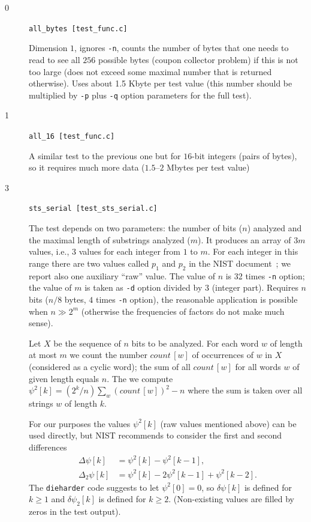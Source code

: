 \documentclass[12pt,a4paper,fullpage]{article}
\begin{document}
\begin{description}

\item[0] \texttt{all\_bytes [test\_func.c]}

Dimension $1$, ignores \texttt{-n}, counts the number of bytes that one needs to read to see all $256$ possible bytes (coupon collector problem) if this is not too large (does not exceed some maximal number that is returned otherwise). Uses about 1.5 Kbyte per test value (this number should be multiplied by \texttt{-p} plus \texttt{-q} option parameters for the full test).

\item[1] \texttt{all\_16 [test\_func.c]}

A similar test to the previous one but for $16$-bit integers (pairs of bytes), so it requires much more data ($1.5$--$2$ Mbytes per test value)

\item[3] \texttt{sts\_serial [test\_sts\_serial.c]}

The test depends on two parameters: the number of bits ($n$) analyzed and the maximal length of substrings analyzed ($m$). It produces an array of $3m$ values, i.e., $3$ values for each  integer from $1$ to $m$. For each integer in this range there are two values called $p_1$ and $p_2$ in the NIST document~\cite{nistsp800-22-1a}; we report also one auxiliary ``raw'' value. The value of $n$ is 32 times \texttt{-n} option; the value of $m$ is taken as \texttt{-d} option divided by $3$ (integer part). Requires $n$ bits ($n/8$ bytes, $4$ times \texttt{-n} option), the reasonable application is possible when $n\gg 2^m$ (otherwise the frequencies of factors do not make much sense). 

Let $X$ be the sequence of $n$ bits to be analyzed. For each word $w$ of length at most $m$ we count the number $\textit{count}\,[w]$ of occurrences of $w$ in $X$ (considered as a cyclic word); the sum of all $\textit{count}\,[w]$ for all words $w$ of given length equals $n$. The we compute $\psi^2[k] = (2^{k}/n)\sum_w (\textit{count}\,[w])^2 - n$ where the sum is taken over all strings $w$ of length $k$.
 
For our purposes the values $\psi^2[k]$ (raw values mentioned above) can be used directly, but NIST
 recommends to consider the first and second differences
\begin{align*}
   \Delta\psi[k] &= \psi^2[k] - \psi^2[k-1],\\
   \Delta_2\psi[k] &= \psi^2[k] - 2\psi^2[k-1] + \psi^2[k-2].
\end{align*}   
The \texttt{dieharder} code suggests to let $\psi^2[0]=0$, so $\delta\psi[k]$ is defined for $k\ge1$ and $\delta\psi_2[k]$ is defined for $k\ge2$. (Non-existing values are filled by zeros in the test output).  
 

\end{description}
\end{document}
